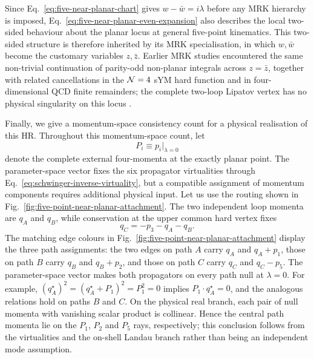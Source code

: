\documentclass[a4paper,11pt]{article}
\begin{document}
Since Eq.~\eqref{eq:five-near-planar-chart} gives
\(w-\bar w=i\lambda\) before any MRK hierarchy is imposed,
Eq.~\eqref{eq:five-near-planar-even-expansion} also describes the local
two-sided behaviour about the planar locus at general five-point
kinematics.  This two-sided structure is therefore inherited by its MRK
specialisation, in which $w,\bar w$ become the customary variables
$z,\bar z$.  Earlier MRK studies encountered the same non-trivial
continuation of parity-odd non-planar integrals across $z=\bar z$, together
with related cancellations in the ${\cal N}=4$ sYM hard function and in
four-dimensional QCD finite remainders; the complete two-loop Lipatov
vertex has no physical singularity on this locus
\cite{Caron-Huot:2020vlo,Buccioni:2024gzo,Abreu:2024xoh}.

Finally, we give a momentum-space consistency count for a physical
realisation of this HR.  Throughout this momentum-space count, let
\[
 P_i\equiv p_i\big|_{\lambda=0}
\]
denote the complete external four-momenta at the exactly planar point.  The
parameter-space vector fixes the six propagator
virtualities through Eq.~\eqref{eq:schwinger-inverse-virtuality}, but a
compatible assignment of momentum components requires additional physical
input.  Let us use the routing shown in
Fig.~\ref{fig:five-point-near-planar-attachment}.  The two independent loop
momenta are \(q_A\) and \(q_B\), while conservation at the upper common hard
vertex fixes
\begin{equation}
 q_C=-p_3-q_A-q_B.
 \label{eq:five-near-planar-loop-routing}
\end{equation}
The matching edge colours in
Fig.~\ref{fig:five-point-near-planar-attachment} display the three path
assignments: the two edges on path \(A\) carry \(q_A\) and \(q_A+p_1\), those
on path \(B\) carry \(q_B\) and \(q_B+p_2\), and those on path \(C\) carry
\(q_C\) and \(q_C-p_5\).  The parameter-space vector makes both propagators
on every path null at \(\lambda=0\).  For example,
\((q_A^\star)^2=(q_A^\star+P_1)^2=P_1^2=0\) implies
\(P_1\mathbin\cdot q_A^\star=0\), and the analogous relations hold on paths
\(B\) and \(C\).  On the physical real branch, each pair of null momenta
with vanishing scalar product is collinear.  Hence the central path momenta
lie on the \(P_1\), \(P_2\) and \(P_5\) rays, respectively; this conclusion
follows from the virtualities and the on-shell Landau branch rather than
being an independent mode assumption.
\end{document}
